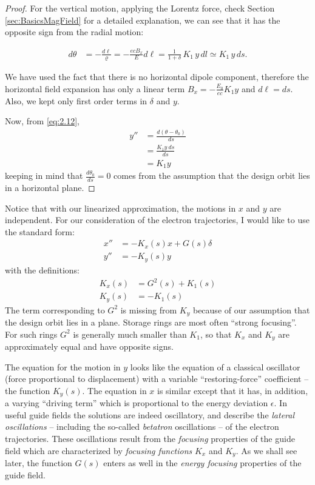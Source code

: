 \begin{proof}
	For the vertical motion, applying the Lorentz force, check Section \ref{sec:BasicsMagField} for a detailed explanation, we can see that it has the opposite sign from the radial motion:

	\begin{align*}
		d\theta &= -\frac{d\ell}{\varrho} = - \frac{ecB_x}{E}d\ell = \frac{1}{1+\delta} \, K_1 \, y \, dl \simeq K_1 \, y \, ds.
	\end{align*}

 We have used the fact that there is no horizontal dipole component, therefore the horizontal field expansion has only a linear term $B_x = - \frac{E_0}{ec} K_1 y$ and $d\ell = ds$. Also, we kept only first order terms in $\delta$ and $y$.

	Now, from \eqref{eq:2.12},
	\begin{align*}
		y'' &= \frac{d(\theta-\theta_0)}{ds}\\
			&= \frac{K_1 y\ ds}{ds}\\
			&= K_1 y
	\end{align*}
	keeping in mind that $\frac{d\theta_0}{ds} = 0$ comes from the assumption that the design orbit lies in a horizontal plane.
\end{proof}

Notice that with our linearized approximation, the motions in $x$ and $y$ are independent. For our consideration of the electron trajectories, I would like to use the standard form:
\begin{align}
	x'' &= -K_x(s)x + G(s)\delta\label{eq:2.19}\\
	y'' &= -K_y(s)y\label{eq:2.20}
\end{align}
with the definitions:
\begin{align}
	K_x(s) &= G^2(s)+K_1(s) \label{eq:2.21}\\
	K_y(s) &= -K_1(s) \label{eq:2.22}
\end{align}
The term corresponding to $G^2$ is missing from $K_y$ because of our assumption that
the design orbit lies in a plane. Storage rings are most often ``strong focusing''. For such rings $G^2$ is generally much smaller than $K_1$, so that $K_x$ and $K_y$ are approximately equal and have opposite signs.

The equation for the motion in $y$ looks like the equation of a classical oscillator (force proportional to displacement) with a variable ``restoring-force'' coefficient -- the function $K_y(s)$. The equation in $x$ is similar except that it has, in addition, a varying ``driving term'' which is proportional to the energy deviation $\epsilon$. In useful guide fields the solutions are indeed oscillatory, and describe the \textit{lateral oscillations} -- including the so-called \textit{betatron} oscillations -- of the electron trajectories. These oscillations result from the \textit{focusing} properties of the guide field which are characterized by \textit{focusing functions} $K_x$ and $K_y$. As we shall see later, the function $G(s)$ enters as well in the \textit{energy focusing} properties of the guide field.

